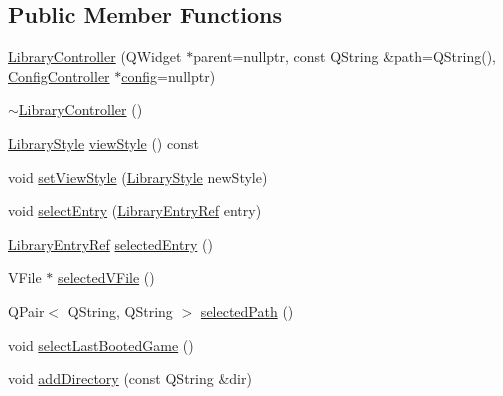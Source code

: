 \subsection*{Public Member Functions}
\begin{DoxyCompactItemize}
\item 
\mbox{\hyperlink{class_q_g_b_a_1_1_library_controller_a1a01950f96642877fa96bf535c5bfd87}{Library\+Controller}} (Q\+Widget $\ast$parent=nullptr, const Q\+String \&path=Q\+String(), \mbox{\hyperlink{class_q_g_b_a_1_1_config_controller}{Config\+Controller}} $\ast$\mbox{\hyperlink{deflate_8c_a4473b5227787415097004fd39f55185e}{config}}=nullptr)
\item 
\mbox{\hyperlink{class_q_g_b_a_1_1_library_controller_ae35abb57acd9caa2d2380486d3fafd75}{$\sim$\+Library\+Controller}} ()
\item 
\mbox{\hyperlink{namespace_q_g_b_a_a4804d48d02699a2c1d2436e9269a8bb8}{Library\+Style}} \mbox{\hyperlink{class_q_g_b_a_1_1_library_controller_a1cfd9fa9822eee84bf488d1b56c84d4b}{view\+Style}} () const
\item 
void \mbox{\hyperlink{class_q_g_b_a_1_1_library_controller_a03b3f54bcf12e4be753ccceef5ee0937}{set\+View\+Style}} (\mbox{\hyperlink{namespace_q_g_b_a_a4804d48d02699a2c1d2436e9269a8bb8}{Library\+Style}} new\+Style)
\item 
void \mbox{\hyperlink{class_q_g_b_a_1_1_library_controller_ac226d6690f902db907fbd66c80c45582}{select\+Entry}} (\mbox{\hyperlink{namespace_q_g_b_a_a201fa9f2cb8f778666a134ba81909358}{Library\+Entry\+Ref}} entry)
\item 
\mbox{\hyperlink{namespace_q_g_b_a_a201fa9f2cb8f778666a134ba81909358}{Library\+Entry\+Ref}} \mbox{\hyperlink{class_q_g_b_a_1_1_library_controller_afa408861ab054246525f8d2b62610133}{selected\+Entry}} ()
\item 
V\+File $\ast$ \mbox{\hyperlink{class_q_g_b_a_1_1_library_controller_a5f99551f35fe696c168ab9a60f390874}{selected\+V\+File}} ()
\item 
Q\+Pair$<$ Q\+String, Q\+String $>$ \mbox{\hyperlink{class_q_g_b_a_1_1_library_controller_a3ab757f52f47c97e0e9b753d51e7a7bd}{selected\+Path}} ()
\item 
void \mbox{\hyperlink{class_q_g_b_a_1_1_library_controller_a31c1c6683f5f348b623da642dbd1f5e1}{select\+Last\+Booted\+Game}} ()
\item 
void \mbox{\hyperlink{class_q_g_b_a_1_1_library_controller_aa8c7e9e762d7740da86d3c6795e01742}{add\+Directory}} (const Q\+String \&dir)
\end{DoxyCompactItemize}
